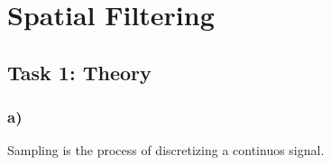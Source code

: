 \section{Spatial Filtering}

\subsection{Task 1: Theory}
\subsubsection*{a)}
Sampling is the process of discretizing a continuos signal. 